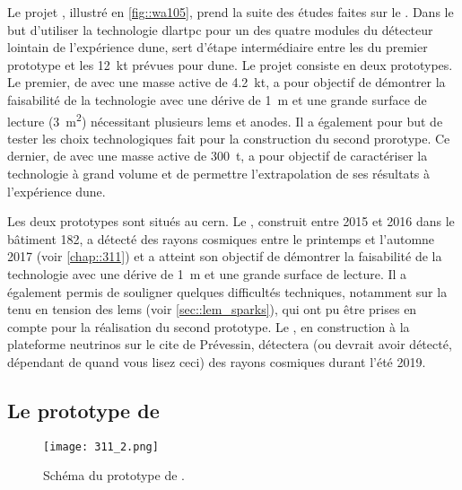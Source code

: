     Le projet \protodp{}, illustré en \autoref{fig::wa105}, prend la suite des études faites sur le \threeL{}. Dans le but d'utiliser la technologie \gls{dlartpc} pour un des quatre modules du détecteur lointain de l'expérience \gls{dune}, \protodp{} sert d'étape intermédiaire entre les \threeL{} du premier prototype et les  \SI{12}{\kilo\tonne} prévues pour \gls{dune}. Le projet consiste en deux prototypes. Le premier, de \TOO{} avec une masse active de \SI{4.2}{\kilo\tonne}, a pour objectif de démontrer la faisabilité de la technologie avec une dérive de \SI{1}{\meter} et une grande surface de lecture (\SI{3}{\meter\squared}) nécessitant plusieurs \glspl{lem} et anodes. Il a également pour but de tester les choix technologiques fait pour la construction du second prorotype. Ce dernier, de \SSS{} avec une masse active de \SI{300}{\tonne}, a pour objectif de caractériser la technologie à grand volume et de permettre l'extrapolation de ses résultats à l'expérience \gls{dune}.

    Les deux prototypes sont situés au \gls{cern}. Le \TOO{}, construit entre 2015 et 2016 dans le bâtiment 182, a détecté des rayons cosmiques entre le printemps et l'automne 2017 (voir \autoref{chap::311}) et a atteint son objectif de démontrer la faisabilité de la technologie avec une dérive de \SI{1}{\meter} et une grande surface de lecture. Il a également permis de souligner quelques difficultés techniques, notamment sur la tenu en tension des \glspl{lem} (voir \autoref{sec::lem_sparks}), qui ont pu être prises en compte pour la réalisation du second prototype.  Le \SSS{}, en construction à la plateforme neutrinos sur le cite de Prévessin, détectera (ou devrait avoir détecté, dépendant de quand vous lisez ceci) des rayons cosmiques durant l'été 2019.

    \subsection{Le prototype de \TOO{}}

      \begin{figure}[htbp]
        \begin{center}\texttt{[image: 311\_2.png]}\end{center}
        \caption[Schéma du prototype de \TOO{}.]{\label{fig::311}Schéma du prototype de \TOO{}.}
      \end{figure}

